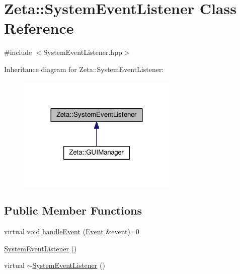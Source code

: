 \hypertarget{classZeta_1_1SystemEventListener}{\section{Zeta\+:\+:System\+Event\+Listener Class Reference}
\label{classZeta_1_1SystemEventListener}
}


{\ttfamily \#include $<$System\+Event\+Listener.\+hpp$>$}



Inheritance diagram for Zeta\+:\+:System\+Event\+Listener\+:\nopagebreak
\begin{figure}[H]
\begin{center}
\leavevmode
\includegraphics[width=216pt]{classZeta_1_1SystemEventListener__inherit__graph}
\end{center}
\end{figure}
\subsection*{Public Member Functions}
\begin{DoxyCompactItemize}
\item 
virtual void \hyperlink{classZeta_1_1SystemEventListener_ad2436f151ef1cbb4cc94962a2211b131}{handle\+Event} (\hyperlink{classZeta_1_1Event}{Event} \&event)=0
\item 
\hyperlink{classZeta_1_1SystemEventListener_aa212c9882bd8dbe498732fdbb3b8b282}{System\+Event\+Listener} ()
\item 
virtual \hyperlink{classZeta_1_1SystemEventListener_a554acdbc79a0e026354ab8b1c76cb038}{$\sim$\+System\+Event\+Listener} ()
\end{DoxyCompactItemize}


